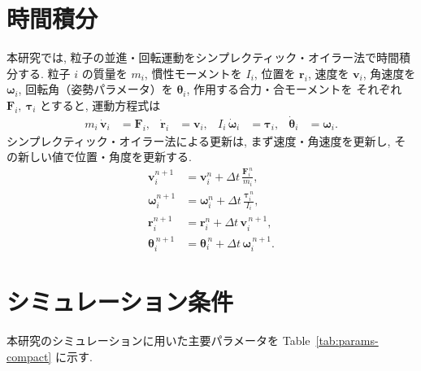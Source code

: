 \documentclass[a4paper,10pt,twocolumn]{ltjsarticle}
\newcommand{\refTab}[1]{Table~\ref{#1}}
\begin{document}
\section{時間積分}
本研究では, 粒子の並進・回転運動をシンプレクティック・オイラー法で時間積分する.
粒子 $i$ の質量を $m_i$, 慣性モーメントを $I_i$, 位置を $\bm r_i$, 速度を $\bm v_i$,
角速度を $\bm\omega_i$, 回転角（姿勢パラメータ）を $\bm\theta_i$, 作用する合力・合モーメントを
それぞれ $\bm F_i,\ \bm\tau_i$ とすると, 運動方程式は
\begin{align}
  m_i\,\dot{\bm v}_i     & = \bm F_i,      &
  \dot{\bm r}_i          & = \bm v_i,      &
  I_i\,\dot{\bm\omega}_i & = \bm\tau_i,    &
  \dot{\bm\theta}_i      & = \bm\omega_i .
\end{align}
シンプレクティック・オイラー法による更新は, まず速度・角速度を更新し, その新しい値で位置・角度を更新する.
\begin{align}
  \bm v_i^{n+1}       & = \bm v_i^{n}      + \Delta t\,\frac{\bm F_i^{\,n}}{m_i},   \\
  \bm\omega_i^{n+1}   & = \bm\omega_i^{n}  + \Delta t\,\frac{\bm\tau_i^{\,n}}{I_i}, \\
  \bm r_i^{n+1}       & = \bm r_i^{n}      + \Delta t\,\bm v_i^{\,n+1},             \\
  \bm\theta_i^{\,n+1} & = \bm\theta_i^{\,n}+ \Delta t\,\bm\omega_i^{\,n+1}.
\end{align}

\section{シミュレーション条件}
本研究のシミュレーションに用いた主要パラメータを \refTab{tab:params-compact} に示す.
\end{document}
